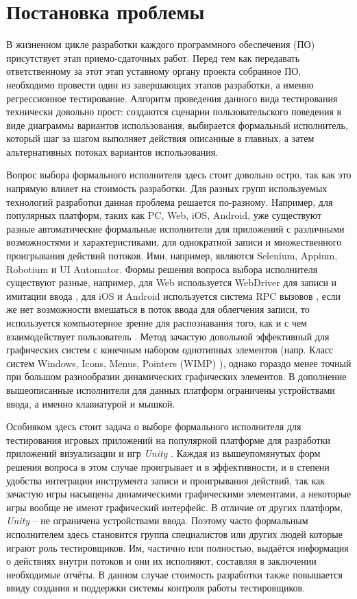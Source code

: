 \Introduction
\section*{Постановка проблемы}
В жизненном цикле разработки каждого программного обеспечения (ПО) присутствует этап приемо-сдаточных работ. Перед тем как передавать ответственному за этот этап уставному органу проекта собранное ПО, необходимо провести один из завершающих этапов разработки, а именно регрессионное тестирование. Алгоритм проведения данного вида тестирования технически довольно прост: создаются сценарии пользовательского поведения в виде диаграммы вариантов использования, выбирается формальный исполнитель, который шаг за шагом выполняет действия описанные в главных, а затем альтернативных потоках вариантов использования.

Вопрос выбора формального исполнителя здесь стоит довольно остро, так как это напрямую влияет на стоимость разработки. Для разных групп используемых технологий разработки данная проблема решается по-разному. Например, для популярных платформ, таких как PC, Web, iOS, Android, уже существуют разные автоматические формальные исполнители для приложений с различными возможностями и характеристиками, для однократной записи и множественного проигрывания действий потоков. Ими, например, являются Selenium, Appium, Robotium и UI Automator. Формы решения вопроса выбора исполнителя существуют разные, например, для Web используется WebDriver для записи и имитации ввода \cite{selenium}, для iOS и Android используется система RPC вызовов \cite{rpc_testing}, если же нет возможности вмешаться в поток ввода для облегчения записи, то используется компьютерное зрение для распознавания того, как и с чем взаимодействует пользователь \cite{appium_opencv}. Метод зачастую довольной эффективный для графических систем с конечным набором однотипных элементов (напр. Класс систем Windows, Icons, Menus, Pointers (WIMP) \cite{wimp}), однако гораздо менее точный при большом разнообразии динамических графических элементов. В дополнение вышеописанные исполнители для данных платформ ограничены устройствами ввода, а именно клавиатурой и мышкой.

Особняком здесь стоит задача о выборе формального исполнителя для тестирования игровых приложений на популярной платформе для разработки приложений визуализации и игр \textit{Unity} \cite{habr}. Каждая из вышеупомянутых форм решения вопроса в этом случае проигрывает и в эффективности, и в степени удобства интеграции инструмента записи и проигрывания действий, так как зачастую игры насыщены динамическими графическими элементами, а некоторые игры вообще не имеют графический интерфейс. В отличие от других платформ, \textit{Unity} -- не ограничена устройствами ввода. Поэтому часто формальным исполнителем здесь становится группа специалистов или других людей которые играют роль тестировщиков. Им, частично или полностью, выдаётся информация о действиях внутри потоков и они их исполняют, составляя в заключении необходимые отчёты. В данном случае стоимость разработки также повышается ввиду создания и поддержки системы контроля работы тестировщиков.

